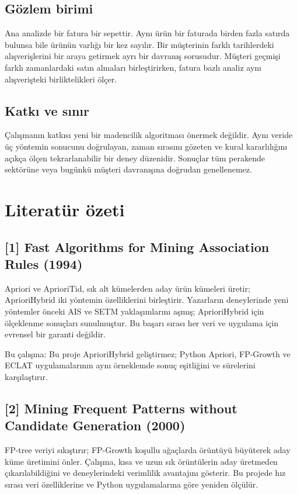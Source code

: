 \documentclass[conference,a4paper]{IEEEtran}
\begin{document}
\subsection{Gözlem birimi}
Ana analizde bir fatura bir sepettir. Aynı ürün bir faturada birden fazla satırda bulunsa bile ürünün varlığı bir kez sayılır. Bir müşterinin farklı tarihlerdeki alışverişlerini bir araya getirmek ayrı bir davranış sorusudur. Müşteri geçmişi farklı zamanlardaki satın almaları birleştirirken, fatura bazlı analiz aynı alışverişteki birliktelikleri ölçer.

\subsection{Katkı ve sınır}
Çalışmanın katkısı yeni bir madencilik algoritması önermek değildir. Aynı veride üç yöntemin sonucunu doğrulayan, zaman sırasını gözeten ve kural kararlılığını açıkça ölçen tekrarlanabilir bir deney düzenidir. Sonuçlar tüm perakende sektörüne veya bugünkü müşteri davranışına doğrudan genellenemez.

\section{Literatür özeti}
\subsection{[1] Fast Algorithms for Mining Association Rules (1994)}
Apriori ve AprioriTid, sık alt kümelerden aday ürün kümeleri üretir; AprioriHybrid iki yöntemin özelliklerini birleştirir. Yazarların deneylerinde yeni yöntemler önceki AIS ve SETM yaklaşımlarını aşmış; AprioriHybrid için ölçeklenme sonuçları sunulmuştur. Bu başarı sırası her veri ve uygulama için evrensel bir garanti değildir.

Bu çalışma: Bu proje AprioriHybrid geliştirmez; Python Apriori, FP-Growth ve ECLAT uygulamalarının aynı örneklemde sonuç eşitliğini ve sürelerini karşılaştırır.

\subsection{[2] Mining Frequent Patterns without Candidate Generation (2000)}
FP-tree veriyi sıkıştırır; FP-Growth koşullu ağaçlarda örüntüyü büyüterek aday küme üretimini önler. Çalışma, kısa ve uzun sık örüntülerin aday üretmeden çıkarılabildiğini ve deneylerindeki verimlilik avantajını gösterir. Bu projede hız sırası veri özelliklerine ve Python uygulamalarına göre yeniden ölçülür.
\end{document}

